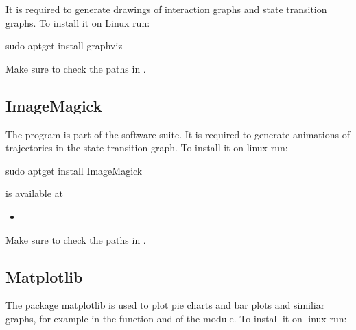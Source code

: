 \documentclass[letterpaper,10pt,english]{sphinxmanual}
\begin{document}
It is required to generate drawings of interaction graphs and state transition graphs.
To install it on Linux run:

\begin{sphinxVerbatim}[commandchars=\\\{\}]
\PYGZdl{} sudo apt\PYGZhy{}get install graphviz
\end{sphinxVerbatim}

Make sure to check the paths in .


\subsection{ImageMagick}
\label{\detokenize{Installation:imagemagick}}\label{\detokenize{Installation:installation-imagemagick}}
The program  is part of the  software suite.
It is required to generate animations of trajectories in the state transition graph.
To install it on linux run:

\begin{sphinxVerbatim}[commandchars=\\\{\}]
\PYGZdl{} sudo apt\PYGZhy{}get install ImageMagick
\end{sphinxVerbatim}

 is available at
\begin{itemize}
\item {} 

\end{itemize}

Make sure to check the paths in .


\subsection{Matplotlib}
\label{\detokenize{Installation:matplotlib}}\label{\detokenize{Installation:installation-matplotlib}}
The package matplotlib is used to plot pie charts and bar plots and similiar graphs,
for example in the function {\hyperref[\detokenize{Basins:weak-basins}]{}} and {\hyperref[\detokenize{Basins:strong-basins}]{}} of the {\hyperref[\detokenize{Basins:basins}]{}} module.
To install it on linux run:
\end{document}
